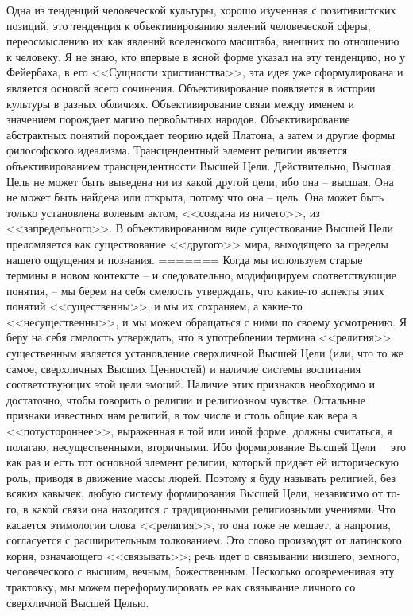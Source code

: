 \documentclass{book}
\begin{document}
Одна из тенденций человеческой культуры, хорошо изучен­ная с позитивистских позиций, это тенденция к объективированию  явлений человеческой сферы, переосмыслению их как яв­лений вселенского масштаба, внешних по отношению к чело­веку. Я не знаю, кто впервые в ясной форме указал на эту тен­денцию, но у Фейербаха, в его <<Сущности христианства>>, эта идея уже сформулирована и является основой всего сочинения. Объективирование появляется в истории культуры в разных обличиях. Объективирование связи между именем и значением порождает магию первобытных народов. Объективирование абстрактных понятий порождает теорию идей Платона, а затем и другие формы философского идеализма. Трансцендентный элемент религии является объективированием трансцендент­ности Высшей Цели. Действительно, Высшая Цель не может быть выведена ни из какой другой цели, ибо она -- высшая. Она не может быть найдена или открыта, потому что она -- цель. Она может быть только установлена волевым актом, <<создана из ничего>>, из <<запредельного>>. В объективирован­ном виде существование Высшей Цели преломляется как су­ществование <<другого>> мира, выходящего за пределы нашего ощущения и познания.
=======
Когда мы используем старые термины в новом контексте -- и следовательно, модифицируем соответствующие понятия, -- мы берем на себя смелость утверждать, что какие-то аспекты этих понятий <<существенны>>, и мы их сохраняем, а какие-то <<несущественны>>, и мы можем обращаться с ними по своему усмотрению. Я беру на себя смелость утверждать, что в упот­реблении термина <<религия>> существенным является установ­ление сверхличной Высшей Цели (или, что то же самое, сверх­личных Высших Ценностей) и наличие системы воспитания соответствующих этой цели эмоций. Наличие этих признаков необходимо и достаточно, чтобы говорить о религии и рели­гиозном чувстве. Остальные признаки известных нам религий, в том числе и столь общие как вера в <<потустороннее>>, выра­женная в той или иной форме, должны считаться, я полагаю, несущественными, вторичными. Ибо формирование Высшей Цели   это как раз и есть тот основной элемент религии, кото­рый придает ей историческую роль, приводя в движение массы людей. Поэтому я буду называть религией, без 
всяких кавычек, любую систему формирования Высшей Цели, независимо от то­го, в какой связи она находится с традиционными религиоз­ными учениями. Что касается этимологии слова <<религия>>, то она тоже не мешает, а напротив, согласуется с расширитель­ным толкованием. Это слово производят от латинского корня, означающего <<связывать>>; речь идет о связывании низшего, земного, человеческого с высшим, вечным, божественным. Не­сколько осовременивая эту трактовку, мы можем переформу­лировать ее как связывание личного со сверхличной Высшей Целью.
\end{document}
